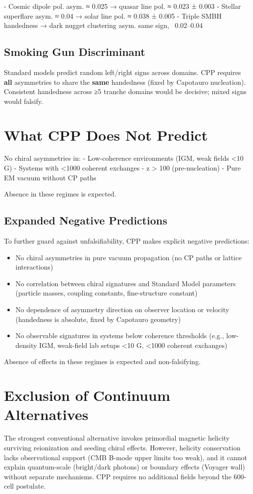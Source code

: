 \documentclass[11pt]{article}
\begin{document}
- Cosmic dipole pol. asym. ≈ 0.025 → quasar line pol. ≈ 0.023 ± 0.003
- Stellar superflare asym. ≈ 0.04 → solar line pol. ≈ 0.038 ± 0.005
- Triple SMBH handedness → dark nugget clustering asym. same sign, ~0.02–0.04

\subsection{Smoking Gun Discriminant}
Standard models predict random left/right signs across domains. CPP requires \textbf{all} asymmetries to share the \textbf{same} handedness (fixed by Capotauro nucleation). Consistent handedness across ≥5 tranche domains would be decisive; mixed signs would falsify.

\section{What CPP Does Not Predict}
No chiral asymmetries in:
- Low-coherence environments (IGM, weak fields <10 G)
- Systems with <1000 coherent exchanges
- z > 100 (pre-nucleation)
- Pure EM vacuum without CP paths

Absence in these regimes is expected.

\subsection{Expanded Negative Predictions}
To further guard against unfalsifiability, CPP makes explicit negative predictions:
\begin{itemize}
    \item No chiral asymmetries in pure vacuum propagation (no CP paths or lattice interactions)
    \item No correlation between chiral signatures and Standard Model parameters (particle masses, coupling constants, fine-structure constant)
    \item No dependence of asymmetry direction on observer location or velocity (handedness is absolute, fixed by Capotauro geometry)
    \item No observable signatures in systems below coherence thresholds (e.g., low-density IGM, weak-field lab setups <10 G, <1000 coherent exchanges)
\end{itemize}
Absence of effects in these regimes is expected and non-falsifying.

\section{Exclusion of Continuum Alternatives}
The strongest conventional alternative invokes primordial magnetic helicity surviving reionization and seeding chiral effects. However, helicity conservation lacks observational support (CMB B-mode upper limits too weak), and it cannot explain quantum-scale (bright/dark photons) or boundary effects (Voyager wall) without separate mechanisms. CPP requires no additional fields beyond the 600-cell postulate.
\end{document}
